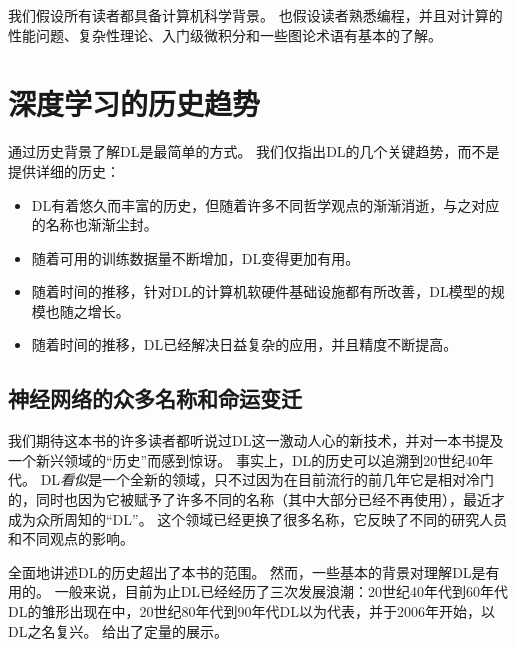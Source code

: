 
我们假设所有读者都具备计算机科学背景。
也假设读者熟悉编程，并且对计算的性能问题、复杂性理论、入门级微积分和一些图论术语有基本的了解。
% 
\section{深度学习的历史趋势}
\label{sec:historical_trends_in_deep_learning}
通过历史背景了解\gls{DL}是最简单的方式。
我们仅指出\gls{DL}的几个关键趋势，而不是提供详细的历史：
\begin{itemize}
 \item \gls{DL}有着悠久而丰富的历史，但随着许多不同哲学观点的渐渐消逝，与之对应的名称也渐渐尘封。
 \item 随着可用的训练数据量不断增加，\gls{DL}变得更加有用。
 \item 随着时间的推移，针对\gls{DL}的计算机软硬件基础设施都有所改善，\gls{DL}模型的规模也随之增长。
 \item 随着时间的推移，\gls{DL}已经解决日益复杂的应用，并且精度不断提高。
\end{itemize}

\subsection{神经网络的众多名称和命运变迁}
\label{sec:the_many_names_and_changing_fortunes_of_neural_networks}

我们期待这本书的许多读者都听说过\gls{DL}这一激动人心的新技术，并对一本书提及一个新兴领域的``历史''而感到惊讶。
事实上，\gls{DL}的历史可以追溯到20世纪40年代。
\gls{DL}\emph{看似}是一个全新的领域，只不过因为在目前流行的前几年它是相对冷门的，同时也因为它被赋予了许多不同的名称（其中大部分已经不再使用），最近才成为众所周知的``\gls{DL}''。
这个领域已经更换了很多名称，它反映了不同的研究人员和不同观点的影响。

全面地讲述\gls{DL}的历史超出了本书的范围。
然而，一些基本的背景对理解\gls{DL}是有用的。
一般来说，目前为止\gls{DL}已经经历了三次发展浪潮：20世纪40年代到60年代\gls{DL}的雏形出现在中，20世纪80年代到90年代\gls{DL}以为代表，并于2006年开始，以\gls{DL}之名复兴。
给出了定量的展示。

